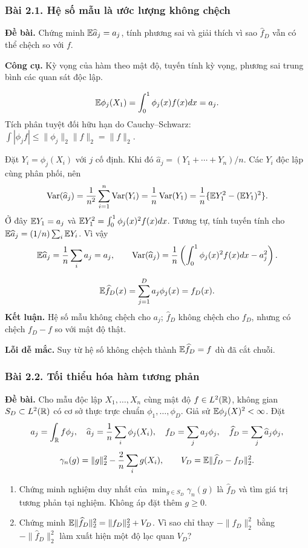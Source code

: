 \subsubsection*{Bài 2.1. Hệ số mẫu là ước lượng không chệch}\label{ot45:projection-coeff}
\textbf{Đề bài.} Chứng minh $\mathbb E\widehat a_j=a_j$, tính phương sai
và giải thích vì sao $\widehat f_D$ vẫn có thể chệch so với $f$.

\textbf{Công cụ.} Kỳ vọng của hàm theo mật độ, tuyến tính kỳ vọng,
phương sai trung bình các quan sát độc lập.

\[
\mathbb E\phi_j(X_1)=\int_0^1\phi_j(x)f(x)dx=a_j.
\]
Tích phân tuyệt đối hữu hạn do Cauchy--Schwarz:
$\int|\phi_j f|\leq\|\phi_j\|_2\|f\|_2=\|f\|_2$.

Đặt $Y_i=\phi_j(X_i)$ với $j$ cố định.
Khi đó $\widehat a_j=(Y_1+\cdots+Y_n)/n$.
Các $Y_i$ độc lập cùng phân phối, nên
\[
\operatorname{Var}(\widehat a_j)=\frac1{n^2}\sum_{i=1}^n\operatorname{Var}(Y_i)
=\frac1n\operatorname{Var}(Y_1)
=\frac1n\{\mathbb E Y_1^2-(\mathbb E Y_1)^2\}.
\]
Ở đây $\mathbb E Y_1=a_j$ và $\mathbb E Y_1^2=\int_0^1\phi_j(x)^2f(x)dx$.
Tương tự, tính tuyến tính cho $\mathbb E\widehat a_j=(1/n)\sum_i\mathbb E Y_i$. Vì vậy
\[
\mathbb E\widehat a_j=\frac1n\sum_i a_j=a_j,\qquad
\operatorname{Var}(\widehat a_j)=\frac1n\left(\int_0^1\phi_j(x)^2f(x)dx-a_j^2\right).
\]

\[
\mathbb E\widehat f_D(x)=\sum_{j=1}^Da_j\phi_j(x)=f_D(x).
\]
\textbf{Kết luận.} Hệ số mẫu không chệch cho $a_j$;
$\widehat f_D$ không chệch cho $f_D$, nhưng có chệch $f_D-f$ so với mật độ thật.

\textbf{Lỗi dễ mắc.} Suy từ hệ số không chệch thành $\mathbb E\widehat f_D=f$ dù đã cắt chuỗi.

\subsubsection*{Bài 2.2. Tối thiểu hóa hàm tương phản}\label{ot45:contrast}
\textbf{Đề bài.} Cho mẫu độc lập $X_1,\ldots,X_n$ cùng mật độ $f\in L^2(\mathbb R)$,
không gian $S_D\subset L^2(\mathbb R)$ có cơ sở thực trực chuẩn $\phi_1,\ldots,\phi_D$.
Giả sử $\mathbb E\phi_j(X)^2<\infty$. Đặt
\[
a_j=\int_{\mathbb R}f\phi_j,\quad \widehat a_j=\frac1n\sum_i\phi_j(X_i),\quad
f_D=\sum_ja_j\phi_j,\quad \widehat f_D=\sum_j\widehat a_j\phi_j,
\]
\[
\gamma_n(g)=\|g\|_2^2-\frac2n\sum_i g(X_i),\qquad
V_D=\mathbb E\|\widehat f_D-f_D\|_2^2.
\]
\begin{enumerate}[label=(\alph*)]
\item Chứng minh nghiệm duy nhất của $\min_{g\in S_D}\gamma_n(g)$ là $\widehat f_D$
và tìm giá trị tương phản tại nghiệm. Không áp đặt thêm $g\geq0$.
\item Chứng minh $\mathbb E\|\widehat f_D\|_2^2=\|f_D\|_2^2+V_D$.
Vì sao chỉ thay $-\|f_D\|_2^2$ bằng $-\|\widehat f_D\|_2^2$ làm xuất hiện một độ lạc quan $V_D$?
\end{enumerate}

